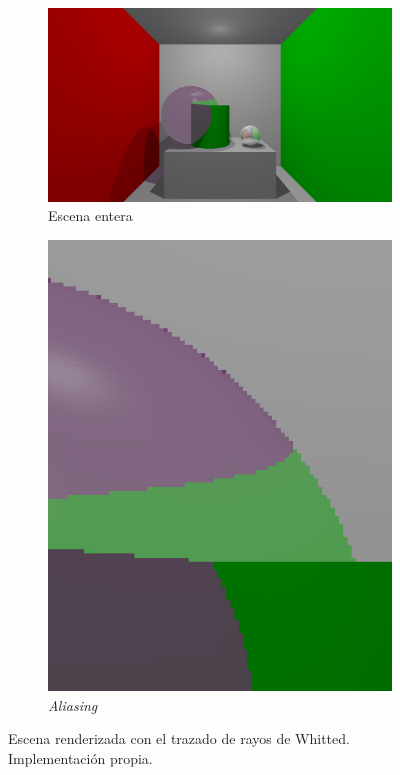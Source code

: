 \begin{figure}
    \begin{center}
    \begin{subfigure}{.69\textwidth}
        \includegraphics[width=\textwidth]{whitted-ray-tracing.png}
        \caption{Escena entera}
    \end{subfigure}
    \begin{subfigure}{.3\textwidth}
        \includegraphics[width=\textwidth]{whitted-aliasing.png}
        \caption{\textit{Aliasing}}
    \end{subfigure}
    \caption{Escena renderizada con el trazado de rayos de Whitted. Implementación propia.}
    \label{fig:whitted-ray-tracing}
    \end{center}
\end{figure}


